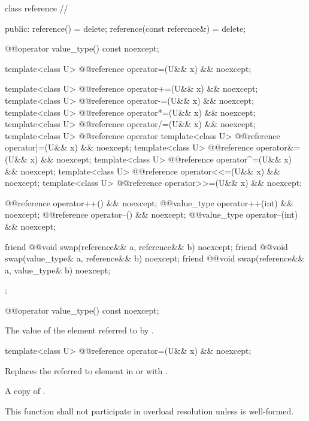 \begin{codeblock}
class reference // \expos
{
public:
  reference() = delete;
  reference(const reference&) = delete;

  @@operator value_type() const noexcept;

  template<class U> @@reference operator=(U&& x) && noexcept;

  template<class U> @@reference operator+=(U&& x) && noexcept;
  template<class U> @@reference operator-=(U&& x) && noexcept;
  template<class U> @@reference operator*=(U&& x) && noexcept;
  template<class U> @@reference operator/=(U&& x) && noexcept;
  template<class U> @@reference operator%
  template<class U> @@reference operator|=(U&& x) && noexcept;
  template<class U> @@reference operator&=(U&& x) && noexcept;
  template<class U> @@reference operator^=(U&& x) && noexcept;
  template<class U> @@reference operator<<=(U&& x) && noexcept;
  template<class U> @@reference operator>>=(U&& x) && noexcept;

  @@reference operator++() && noexcept;
  @@value_type operator++(int) && noexcept;
  @@reference operator--() && noexcept;
  @@value_type operator--(int) && noexcept;

  friend @@void swap(reference&& a, reference&& b) noexcept;
  friend @@void swap(value_type& a, reference&& b) noexcept;
  friend @@void swap(reference&& a, value_type& b) noexcept;
};
\end{codeblock}

\begin{itemdecl}
@@operator value_type() const noexcept;
\end{itemdecl}

\begin{itemdescr}
  \pnum\returns
  The value of the element referred to by .
\end{itemdescr}

\begin{itemdecl}
template<class U> @@reference operator=(U&& x) && noexcept;
\end{itemdecl}

\begin{itemdescr}
  \pnum\effects
  Replaces the referred to element in  or  with .

  \pnum\returns
  A copy of .

  \pnum\remarks
  This function shall not participate in overload resolution unless  is well-formed.
\end{itemdescr}

